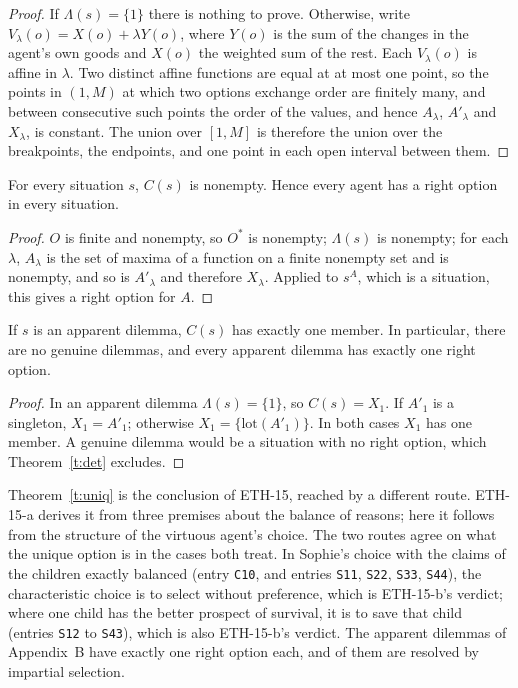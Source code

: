 \documentclass{situationist-preprint}
\newcommand{\Ch}{C}
\newcommand{\lot}{\mathrm{lot}}
\begin{document}
\begin{proof}
If $\Lambda(s)=\{1\}$ there is nothing to prove. Otherwise, write $V_\lambda(o)=X(o)+\lambda Y(o)$, where $Y(o)$ is the sum of the changes in the agent's own goods and $X(o)$ the weighted sum of the rest. Each $V_\lambda(o)$ is affine in $\lambda$. Two distinct affine functions are equal at at most one point, so the points in $(1,M)$ at which two options exchange order are finitely many, and between consecutive such points the order of the values, and hence $A_\lambda$, $A'_\lambda$ and $X_\lambda$, is constant. The union over $[1,M]$ is therefore the union over the breakpoints, the endpoints, and one point in each open interval between them.
\end{proof}

\begin{theorem}[Determinacy]\label{t:det}
For every situation $s$, $\Ch(s)$ is nonempty. Hence every agent has a right option in every situation.
\end{theorem}

\begin{proof}
$O$ is finite and nonempty, so $O^\ast$ is nonempty; $\Lambda(s)$ is nonempty; for each $\lambda$, $A_\lambda$ is the set of maxima of a function on a finite nonempty set and is nonempty, and so is $A'_\lambda$ and therefore $X_\lambda$. Applied to $s^A$, which is a situation, this gives a right option for $A$.
\end{proof}

\begin{theorem}\label{t:uniq}
If $s$ is an apparent dilemma, $\Ch(s)$ has exactly one member. In particular, there are no genuine dilemmas, and every apparent dilemma has exactly one right option.
\end{theorem}

\begin{proof}
In an apparent dilemma $\Lambda(s)=\{1\}$, so $\Ch(s)=X_1$. If $A'_1$ is a singleton, $X_1=A'_1$; otherwise $X_1=\{\lot(A'_1)\}$. In both cases $X_1$ has one member. A genuine dilemma would be a situation with no right option, which Theorem~\ref{t:det} excludes.
\end{proof}

Theorem~\ref{t:uniq} is the conclusion of ETH-15, reached by a different route. ETH-15-a derives it from three premises about the balance of reasons; here it follows from the structure of the virtuous agent's choice. The two routes agree on what the unique option is in the cases both treat. In Sophie's choice with the claims of the children exactly balanced (entry \texttt{C10}, and entries \texttt{S11}, \texttt{S22}, \texttt{S33}, \texttt{S44}), the characteristic choice is to select without preference, which is ETH-15-b's verdict; where one child has the better prospect of survival, it is to save that child (entries \texttt{S12} to \texttt{S43}), which is also ETH-15-b's verdict. The \stnad{} apparent dilemmas of Appendix~B have exactly one right option each, and \stnlot{} of them are resolved by impartial selection.
\end{document}
